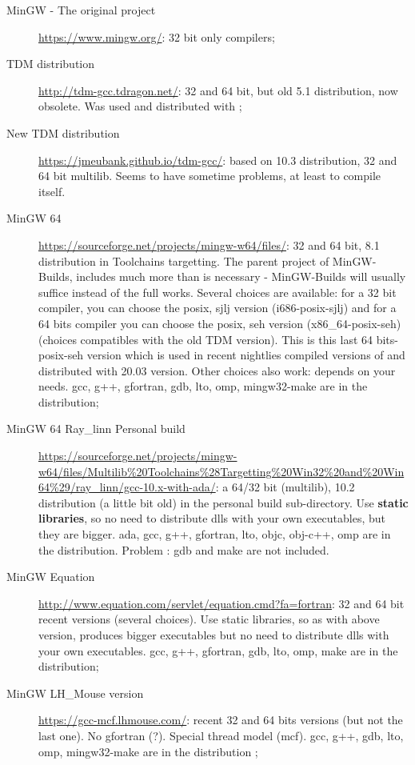 \begin{description}
\item[MinGW - The original project] \url{https://www.mingw.org/}: 32 bit only compilers;
\item[TDM distribution]\url{http://tdm-gcc.tdragon.net/}: 32 and 64 bit, but old 5.1 distribution, now obsolete. Was used and distributed with ;
\item[New TDM distribution]\url{https://jmeubank.github.io/tdm-gcc/}: based on 10.3 distribution, 32 and 64 bit multilib. Seems to have sometime problems, at least to compile \codeblocks itself.
\item[MinGW 64] \url{https://sourceforge.net/projects/mingw-w64/files/}: 32 and 64 bit, 8.1 distribution in Toolchains targetting. The parent project of MinGW-Builds, includes much more than is necessary - MinGW-Builds will usually suffice instead of the full works. Several choices are available: for a 32 bit compiler, you can choose the posix, sjlj version (i686-posix-sjlj) and for a 64 bits compiler you can choose the posix, seh version (x86\_64-posix-seh) (choices compatibles with the old TDM version). This is this last 64 bits-posix-seh version which is used in recent nightlies compiled versions of \codeblocks and distributed with 20.03 version. Other choices also work: depends on your needs. gcc, g++, gfortran, gdb, lto, omp, mingw32-make are in the distribution;
\item[MinGW 64 Ray\_linn Personal build] \url{https://sourceforge.net/projects/mingw-w64/files/Multilib%20Toolchains%28Targetting%20Win32%20and%20Win64%29/ray_linn/gcc-10.x-with-ada/}: a 64/32 bit (multilib), 10.2 distribution (a little bit old) in the personal build sub-directory. Use \textbf{static libraries}, so no need to distribute dlls with your own executables, but they are bigger. ada, gcc, g++, gfortran, lto, objc, obj-c++, omp are in the distribution. Problem : gdb and make are not included.
\item[MinGW Equation] \url{http://www.equation.com/servlet/equation.cmd?fa=fortran}: 32 and 64 bit recent versions (several choices). Use static libraries, so as with above version, produces bigger executables but no need to distribute dlls with your own executables.  gcc, g++, gfortran, gdb, lto, omp, make are in the distribution;
\item[MinGW LH\_Mouse version] \url{https://gcc-mcf.lhmouse.com/}: recent 32 and 64 bits versions (but not the last one). No gfortran (?). Special thread model (mcf).  gcc, g++, gdb, lto, omp, mingw32-make are in the distribution ;

\end{description}
